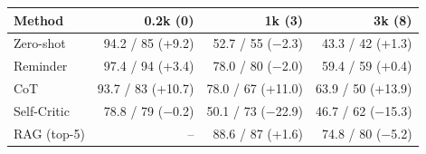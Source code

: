 \begin{tabular}{lrrr}
\toprule
Method & 0.2k (0) & 1k (3) & 3k (8) \\
\midrule
Zero-shot & 94.2 / 85 (+9.2) & 52.7 / 55 ($-$2.3) & 43.3 / 42 (+1.3) \\
Reminder & 97.4 / 94 (+3.4) & 78.0 / 80 ($-$2.0) & 59.4 / 59 (+0.4) \\
CoT & 93.7 / 83 (+10.7) & 78.0 / 67 (+11.0) & 63.9 / 50 (+13.9) \\
Self-Critic & 78.8 / 79 ($-$0.2) & 50.1 / 73 ($-$22.9) & 46.7 / 62 ($-$15.3) \\
RAG (top-5) & -- & 88.6 / 87 (+1.6) & 74.8 / 80 ($-$5.2) \\
\bottomrule
\end{tabular}

